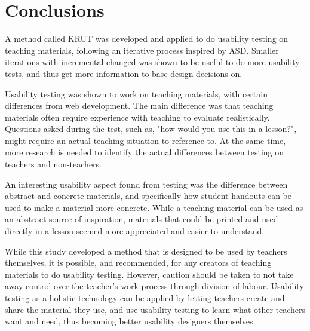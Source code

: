 \chapter{Conclusions}

A method called KRUT was developed and applied to do usability testing on teaching materials, following an iterative process inspired by ASD. Smaller iterations with incremental changed was shown to be useful to do more usability tests, and thus get more information to base design decisions on.

Usability testing was shown to work on teaching materials, with certain differences from web development. The main difference was that teaching materials often require experience with teaching to evaluate realistically. Questions asked during the test, such as, "how would you use this in a lesson?", might require an actual teaching situation to reference to. At the same time, more research is needed to identify the actual differences between testing on teachers and non-teachers.

An interesting usability aspect found from testing was the difference between abstract and concrete materials, and specifically how student handouts can be used to make a material more concrete. While a teaching material can be used as an abstract source of inspiration, materials that could be printed and used directly in a lesson seemed more appreciated and easier to understand.

While this study developed a method that is designed to be used by teachers themselves, it is possible, and recommended, for any creators of teaching materials to do usability testing. However, caution should be taken to not take away control over the teacher's work process through division of labour. Usability testing as a holistic technology can be applied by letting teachers create and share the material they use, and use usability testing to learn what other teachers want and need, thus becoming better usability designers themselves.
